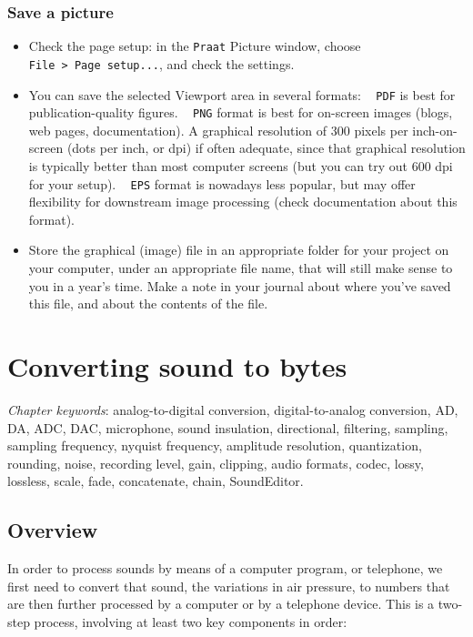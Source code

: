 \documentclass[
]{book}
\begin{document}
\subsection{Save a picture}\label{save-a-picture}

\begin{itemize}
\item
  Check the page setup: in the \texttt{Praat} Picture window, choose \texttt{File\ \textgreater{}\ Page\ setup...}, and check the settings.
\item
  You can save the selected Viewport area in several formats: ~
  \texttt{PDF} is best for publication-quality figures. ~
  \texttt{PNG} format is best for on-screen images (blogs, web pages, documentation). A graphical resolution of 300 pixels per inch-on-screen (dots per inch, or dpi) if often adequate, since that graphical resolution is typically better than most computer screens (but you can try out 600 dpi for your setup). ~
  \texttt{EPS} format is nowadays less popular, but may offer flexibility for downstream image processing (check documentation about this format).
\item
  Store the graphical (image) file in an appropriate folder for your project on your computer, under an appropriate file name, that will still make sense to you in a year's time. Make a note in your journal about where you've saved this file, and about the contents of the file.
\end{itemize}

\chapter{Converting sound to bytes}\label{ch-soundtobytes}

\emph{Chapter keywords}: analog-to-digital conversion, digital-to-analog conversion, AD, DA, ADC, DAC, microphone, sound insulation, directional, filtering, sampling, sampling frequency, nyquist frequency, amplitude resolution, quantization, rounding, noise, recording level, gain, clipping, audio formats, codec, lossy, lossless, scale, fade, concatenate, chain, SoundEditor.

\section{Overview}\label{sec:ADCoverview}

In order to process sounds by means of a computer program, or telephone, we first need to convert that sound, the variations in air pressure, to numbers that are then further processed by a computer or by a telephone device. This is a two-step process, involving at least two key components in order:
\end{document}
